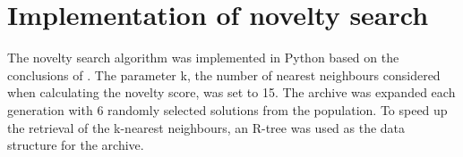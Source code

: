 \section{Implementation of novelty search}
The novelty search algorithm was implemented in Python based on the conclusions of \cite{ns_study}.
The parameter k, the number of nearest neighbours considered when calculating the novelty score,
was set to 15. The archive was expanded each generation with $6$ randomly selected
solutions from the population. To speed up the retrieval of the k-nearest neighbours, an
R-tree was used as the data structure for the archive.